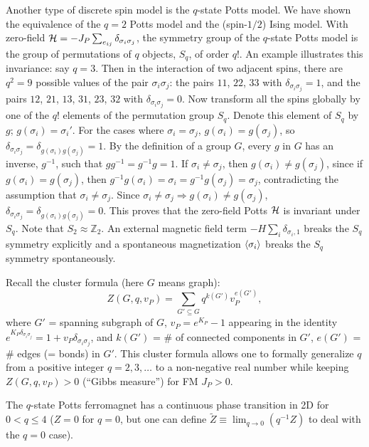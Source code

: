 Another type of discrete spin model is the $q$-state Potts model. We have shown the equivalence of the
$q = 2$ Potts model and the (spin-$1/2$) Ising model. With zero-field
$\mathcal{H} = -J_P\sum_{e_{ij}}\delta_{\sigma_i\sigma_j}$, the symmetry group of the $q$-state Potts model is
the group of permutations of $q$ objects, $S_q$, of order $q!$. An example illustrates this invariance:
say $q = 3$. Then in the interaction of two adjacent spins, there are $q^2 = 9$ possible values of the
pair $\sigma_i\sigma_j$: the pairs $11$, $22$, $33$ with $\delta_{\sigma_i\sigma_j} = 1$, and the pairs
$12$, $21$, $13$, $31$, $23$, $32$ with $\delta_{\sigma_i\sigma_j} = 0$. Now transform all the spins
globally by one of the $q!$ elements of the permutation group $S_q$. Denote this element of $S_q$ by
$g$; $g(\sigma_i) = \sigma_i'$. For the cases where $\sigma_i = \sigma_j$, $g(\sigma_i) = g(\sigma_j)$, so
$\delta_{\sigma_i\sigma_j} = \delta_{g(\sigma_i)g(\sigma_j)} = 1$. By the definition of a group $G$, every
$g$ in $G$ has an inverse, $g^{-1}$, such that $gg^{-1} = g^{-1}g = 1$. If $\sigma_i\ne\sigma_j$, then
$g(\sigma_i)\ne g(\sigma_j)$, since if $g(\sigma_i) = g(\sigma_j)$, then
$g^{-1}g(\sigma_i) = \sigma_i = g^{-1}g(\sigma_j) = \sigma_j$, contradicting the assumption that
$\sigma_i\ne\sigma_j$. Since $\sigma_i\ne\sigma_j\Rightarrow g(\sigma_i)\ne g(\sigma_j)$,
$\delta_{\sigma_i\sigma_j} = \delta_{g(\sigma_i)g(\sigma_j)} = 0$. This proves that the zero-field Potts
$\mathcal{H}$ is invariant under $S_q$. Note that $S_2\approx\mathbb{Z}_2$. An external magnetic field term
$-H\sum_i\delta_{\sigma_i,1}$ breaks the $S_q$ symmetry explicitly and a spontaneous magnetization
$\langle \sigma_i\rangle$ breaks the $S_q$ symmetry spontaneously.

Recall the cluster formula (here $G$ means graph):
\begin{equation}
  Z(G,q,v_P) = \sum_{G'\subseteq G}q^{k(G')}v_P^{e(G')},
\end{equation}
where $G'$ = spanning subgraph of $G$, $v_P = e^{K_P}-1$ appearing in the identity
$e^{K_P\delta_{\sigma_i\sigma_j}} = 1 + v_P\delta_{\sigma_i\sigma_j}$, and $k(G')$ = \# of connected
components in $G'$, $e(G')$ = \# edges (= bonds) in $G'$. This cluster formula allows one to formally
generalize $q$ from a positive integer $q = 2,3,\ldots$ to a non-negative real number while keeping
$Z(G,q,v_P)>0$ (``Gibbs measure'') for FM $J_P>0$.

The $q$-state Potts ferromagnet has a continuous phase transition in 2D for $0<q\le 4$ ($Z = 0$ for
$q = 0$, but one can define $\tilde Z\equiv\lim_{q\to 0}(q^{-1}Z)$ to deal with the $q = 0$ case).

